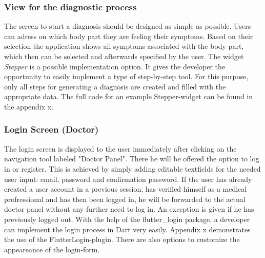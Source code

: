 \subsubsection{\textbf{View for the diagnostic process}}
The screen to start a diagnosis should be designed as simple as possible. Users can adress on which body part they are feeling their symptoms. Based on their selection the application shows all symptoms associated with the body part, which then can be selected and afterwards specified by the user. The widget \textit{Stepper} is a possible implementation option. It gives the developer the opportunity to easily implement a type of step-by-step tool. For this purpose, only all steps for generating a diagnosis are created and filled with the appropriate data. The full code for an example Stepper-widget can be found in the appendix x.

\subsubsection{\textbf{Login Screen (Doctor)}}
The login screen is displayed to the user immediately after clicking on the navigation tool labeled "Doctor Panel". There he will be offered the option to log in or register. This is achieved by simply adding editable textfields for the needed user input: email, password and confirmation password. If the user has already created a user account in a previous session, has verified himself as a medical profressional and has then been logged in, he will be forwarded to the actual doctor panel without any further need to log in. An exception is given if he has previously logged out. With the help of the flutter\_login package, a developer can implement the login process in Dart very easily. Appendix x demonstrates the use of the FlutterLogin-plugin. There are also options to customize the appeareance of the login-form.
